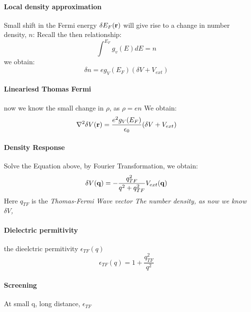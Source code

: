 \documentclass[12pt,a4paper]{article}
\begin{document}
\begin{enumerate}
                \paragraph*{Local density approximation}
                    Small shift in the Fermi energy $\delta E_F(\vb{r})$ will give rise to a change in number density, $n$:
                    Recall the then relationship:
                    \begin{equation}
                        \int^{E_F} g_v(E) dE = n
                    \end{equation}
                    we obtain:
                    \begin{equation}
                        \delta n = e g_V(E_F)(\delta V + V_{ext})
                    \end{equation}
                \paragraph*{Lineariesd Thomas Fermi}
                    now we know the small change in $\rho$, as $\rho = e n$
                    We obtain:
                    \begin{equation}
                        \laplacian{\delta V(\vb{r})} = \frac{e^2 g_V(E_F)}{\epsilon_0}(\delta V + V_{ext})
                    \end{equation}
                \paragraph {Density Response}
                    Solve the Equation above, by Fourier Transformation, we obtain:
                    \begin{equation}
                        \delta V(\vb{q}) = -\frac{q^2_{TF}}{q^2+q^2_{TF}}V_{ext}(\vb{q})
                    \end{equation}
                    Here $q_{TF}$ is the \it{Thomas-Fermi Wave vector}
                    The number density, as now we know $\delta V$, 
                \paragraph*{Dielectric permitivity}
                    the dieelctric permitivity $\epsilon_{TF}(q)$
                    \begin{equation}
                        \epsilon_{TF}(q)= 1+ \frac{q_{TF}^2}{q^2}
                    \end{equation}
                \paragraph*{Screening}
                    At small q, long distance, $\epsilon_{TF}$
            \end{enumerate}
\end{document}
